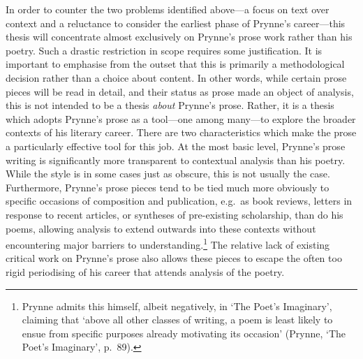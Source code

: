 \documentclass[]{article}
\begin{document}
In order to counter the two problems identified above—a focus on text
over context and a reluctance to consider the earliest phase of Prynne’s
career—this thesis will concentrate almost exclusively on Prynne’s prose
work rather than his poetry. Such a drastic restriction in scope
requires some justification. It is important to emphasise from the
outset that this is primarily a methodological decision rather than a
choice about content. In other words, while certain prose pieces will be
read in detail, and their status as prose made an object of analysis,
this is not intended to be a thesis \emph{about} Prynne’s prose. Rather,
it is a thesis which adopts Prynne’s prose as a tool—one among many—to
explore the broader contexts of his literary career. There are two
characteristics which make the prose a particularly effective tool for
this job. At the most basic level, Prynne’s prose writing is
significantly more transparent to contextual analysis than his poetry.
While the style is in some cases just as obscure, this is not usually
the case. Furthermore, Prynne’s prose pieces tend to be tied much more
obviously to specific occasions of composition and publication, e.g.~as
book reviews, letters in response to recent articles, or syntheses of
pre-existing scholarship, than do his poems, allowing analysis to extend
outwards into these contexts without encountering major barriers to
understanding.\footnote{Prynne admits this himself, albeit negatively,
  in ‘The Poet’s Imaginary’, claiming that ‘above all other classes of
  writing, a poem is least likely to ensue from specific purposes
  already motivating its occasion’ (Prynne, ‘The Poet’s Imaginary’,
  p.~89).} The relative lack of existing critical work on Prynne’s prose
also allows these pieces to escape the often too rigid periodising of
his career that attends analysis of the poetry.
\end{document}
